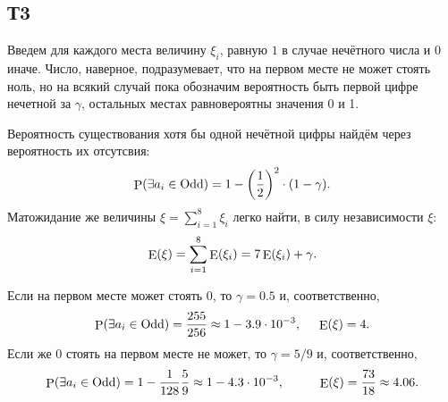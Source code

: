 \subsection*{Т3}

Введем для каждого места величину $\xi_i$, равную $1$ в случае нечётного числа и $0$ иначе. Число, наверное, подразумевает, что на первом месте не может стоять ноль, но на всякий случай пока обозначим вероятность быть первой цифре нечетной за $\gamma$, остальных местах равновероятны значения 0 и 1.

Вероятность существования хотя бы одной нечётной цифры найдём через вероятность их отсутсвия:
\begin{equation*}
    \P(\exists a_i \in \textnormal{Odd}) = 1 - \left(\frac{1}{2}\right)^2 \cdot (1-\gamma).
\end{equation*}
Матожидание же величины $\xi = \sum_{i=1}^8 \xi_i$ легко найти, в силу независимости $\xi$:
\begin{equation*}
    \E(\xi) = \sum_{i=1}^8 \E(\xi_i) = 7 \E(\xi_i) + \gamma.
\end{equation*}

Если на первом месте может стоять $0$, то $\gamma = 0.5$ и, соответственно,
\begin{equation*}
    \P(\exists a_i \in \textnormal{Odd}) = \frac{255}{256} \approx 1 - 3.9 \cdot 10^{-3},
    \hspace{5 mm}
    \E(\xi) = 4.
\end{equation*}
Если же $0$ стоять на первом месте не может, то  $\gamma = 5/9$ и, соответственно,
\begin{equation*}
    \P(\exists a_i \in \textnormal{Odd}) = 1 - \frac{1}{128} \frac{5}{9} \approx 1 - 4.3 \cdot 10^{-3},
    \hspace{10 mm}
    \E(\xi) =  \frac{73}{18} \approx 4.06.
\end{equation*}